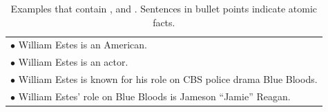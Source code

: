 \begin{table}[t]
\begin{tabular}{p{7.6cm}}
        $\mathbf{\bullet}$ William Estes is an American. \mypink{\irLabel} \\
        $\mathbf{\bullet}$ William Estes is an actor. \mypink{\irLabel}\\
        $\mathbf{\bullet}$ William Estes is known for his role on CBS police drama Blue Bloods. \mypink{\irLabel}\\
        $\mathbf{\bullet}$ William Estes' role on Blue Bloods is Jameson ``Jamie'' Reagan. \mypink{\irLabel} \\
        \bottomrule
    \end{tabular}
    \caption{
      Examples that contain \myblue{\sLabel}, \mypurple{\nsLabel} and \mypink{\irLabel}. Sentences in bullet points indicate atomic facts.
    }\label{tab:example-label}
\end{table}

